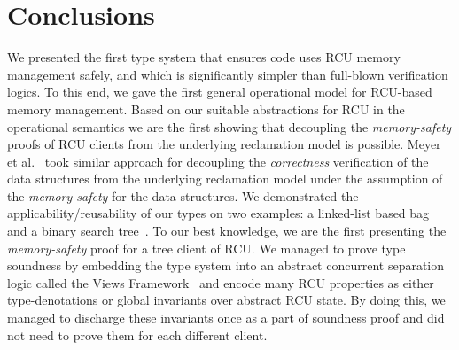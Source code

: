 \section{Conclusions}
\label{sec:concls}
We presented the first type system that ensures code uses RCU memory management safely, and which is significantly simpler than full-blown verification logics. To this end, we gave the first general operational model for RCU-based memory management. Based on our suitable abstractions for RCU in the operational semantics we are the first showing that decoupling the \textit{memory-safety} proofs of RCU clients from the underlying reclamation model is possible. Meyer et al.~\cite{myr} took similar approach for decoupling the \textit{correctness} verification of the data structures from the underlying reclamation model under the assumption of the \textit{memory-safety} for the data structures. We demonstrated the applicability/reusability of our types on two examples: a linked-list based bag~\cite{McKenney2015SomeEO} and a binary search tree~\cite{Arbel:2014:CUR:2611462.2611471}. To our best knowledge, we are the first presenting the \textit{memory-safety} proof for a tree client of RCU. We managed to prove type soundness by embedding the type system into an abstract concurrent separation logic called the Views Framework~\cite{views} and encode many RCU properties as either type-denotations or global invariants over abstract RCU state. By doing this, we managed to discharge these invariants once as a part of soundness proof and did not need to prove them for each different client.
